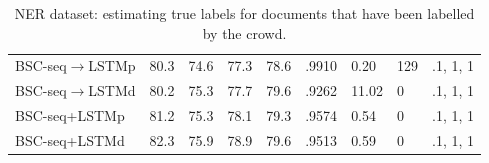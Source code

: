 \begin{table}
\begin{tabularx}{\textwidth}{| l | Y | Y | Y | Y | Y | Y | Y | >{\raggedleft\arraybackslash}p{1.6cm} |}
BSC-seq$\rightarrow$LSTMp & 80.3 & 74.6 & 77.3 & 78.6 & .9910 & 0.20 & 129 & .1, 1, 1 \\
BSC-seq$\rightarrow$LSTMd & 80.2 & 75.3 & 77.7 & 79.6 & .9262 & 11.02 & 0 & .1, 1, 1 \\
BSC-seq+LSTMp & 81.2 & 75.3 & 78.1 & 79.3 & .9574 & 0.54 & 0 & .1, 1, 1 \\
BSC-seq+LSTMd & 82.3 & 75.9 & 78.9 & 79.6 & .9513 & 0.59 & 0 & .1, 1, 1 \\
\hline
\end{tabularx}
\caption{NER dataset: estimating true labels for documents that have been labelled by the crowd.}
\label{tab:aggregation_results_ner}
\npnoround
\end{table}



